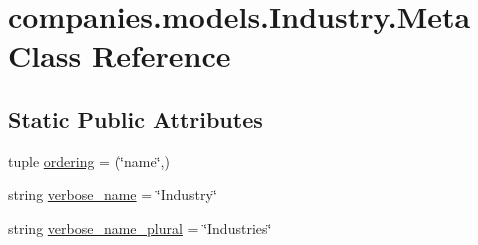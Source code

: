 \hypertarget{classcompanies_1_1models_1_1_industry_1_1_meta}{\section{companies.\-models.\-Industry.\-Meta Class Reference}
\label{classcompanies_1_1models_1_1_industry_1_1_meta}
}
\subsection*{Static Public Attributes}
\begin{DoxyCompactItemize}
\item 
tuple \hyperlink{classcompanies_1_1models_1_1_industry_1_1_meta_a249a36a0e0575620cde3cc9e1ab8df14}{ordering} = (\char`\"{}name\char`\"{},)
\item 
string \hyperlink{classcompanies_1_1models_1_1_industry_1_1_meta_aafef6ba0a94954b4b72017b5d6f232e0}{verbose\-\_\-name} = \char`\"{}Industry\char`\"{}
\item 
string \hyperlink{classcompanies_1_1models_1_1_industry_1_1_meta_a60cee024a61d8c7b3a5b4c339391661c}{verbose\-\_\-name\-\_\-plural} = \char`\"{}Industries\char`\"{}
\end{DoxyCompactItemize}



